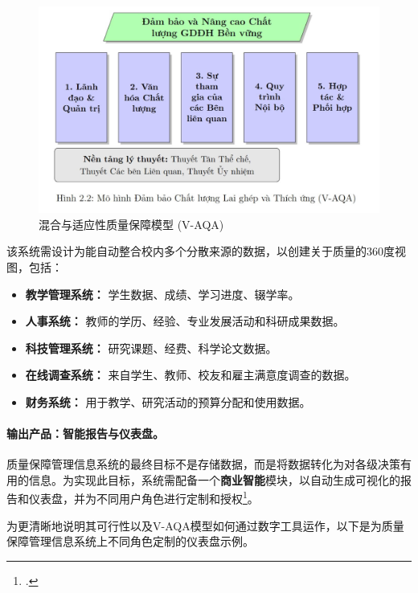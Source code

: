 \begin{figure}[h!]
    \centering
    \includegraphics[width=\textwidth]{image/mo_hinh_V-AQA.jpg}
    \caption{混合与适应性质量保障模型 (V-AQA)}
    \label{fig:v-aqa-model-detailed}
\end{figure}

该系统需设计为能自动整合校内多个分散来源的数据，以创建关于质量的360度视图，包括：
\begin{itemize}
    \item \textbf{教学管理系统：} 学生数据、成绩、学习进度、辍学率。
    \item \textbf{人事系统：} 教师的学历、经验、专业发展活动和科研成果数据。
    \item \textbf{科技管理系统：} 研究课题、经费、科学论文数据。
    \item \textbf{在线调查系统：} 来自学生、教师、校友和雇主满意度调查的数据。
    \item \textbf{财务系统：} 用于教学、研究活动的预算分配和使用数据。
\end{itemize}

\paragraph{输出产品：智能报告与仪表盘。}
质量保障管理信息系统的最终目标不是存储数据，而是将数据转化为对各级决策有用的信息。为实现此目标，系统需配备一个\textbf{商业智能}模块，以自动生成可视化的报告和仪表盘，并为不同用户角色进行定制和授权\footcite{uq_kpi_dashboard}。

为更清晰地说明其可行性以及V-AQA模型如何通过数字工具运作，以下是为质量保障管理信息系统上不同角色定制的仪表盘示例。

